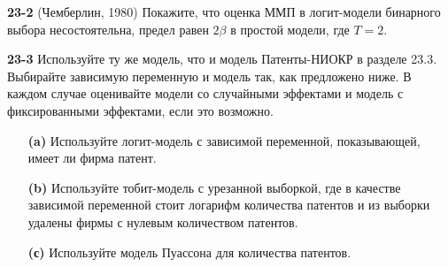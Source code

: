 \textbf{23-2} (Чемберлин, 1980) Покажите, что оценка ММП в логит-модели бинарного выбора несостоятельна, предел равен $2\beta$ в простой модели, где $T=2$.

\textbf{23-3}  Используйте ту же модель, что и модель Патенты-НИОКР в разделе 23.3. Выбирайте зависимую переменную и модель так, как предложено ниже. В каждом случае оценивайте модели со случайными эффектами и модель с фиксированными эффектами, если это возможно.

\begin{itemize}
\item[{\bf (a)}] Используйте логит-модель с зависимой переменной, показывающей, имеет ли фирма патент.
\item[{\bf (b)}] Используйте тобит-модель с урезанной выборкой, где в качестве зависимой переменной стоит логарифм количества патентов и из выборки удалены фирмы с нулевым количеством патентов.  
\item[{\bf (с)}] Используйте модель Пуассона для количества патентов.
\end{itemize}


